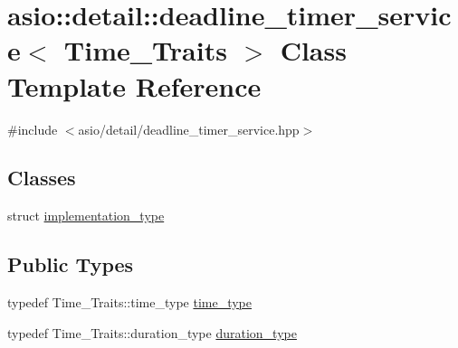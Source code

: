 \hypertarget{classasio_1_1detail_1_1deadline__timer__service}{}\section{asio\+:\+:detail\+:\+:deadline\+\_\+timer\+\_\+service$<$ Time\+\_\+\+Traits $>$ Class Template Reference}
\label{classasio_1_1detail_1_1deadline__timer__service}


{\ttfamily \#include $<$asio/detail/deadline\+\_\+timer\+\_\+service.\+hpp$>$}

\subsection*{Classes}
\begin{DoxyCompactItemize}
\item 
struct \hyperlink{structasio_1_1detail_1_1deadline__timer__service_1_1implementation__type}{implementation\+\_\+type}
\end{DoxyCompactItemize}
\subsection*{Public Types}
\begin{DoxyCompactItemize}
\item 
typedef Time\+\_\+\+Traits\+::time\+\_\+type \hyperlink{classasio_1_1detail_1_1deadline__timer__service_a217817497abe6136c056c0facdd3f8aa}{time\+\_\+type}
\item 
typedef Time\+\_\+\+Traits\+::duration\+\_\+type \hyperlink{classasio_1_1detail_1_1deadline__timer__service_aa2f42592b15216b94578b059efa9b304}{duration\+\_\+type}
\end{DoxyCompactItemize}
